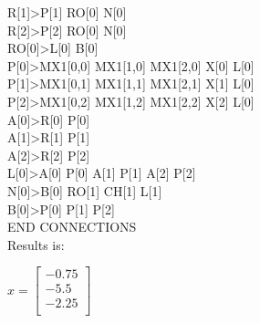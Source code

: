 \documentclass[12pt,a4paper]{article}
\begin{document}
R[1]>P[1] RO[0] N[0]\\
R[2]>P[2] RO[0] N[0]\\
RO[0]>L[0] B[0]\\
P[0]>MX1[0,0] MX1[1,0] MX1[2,0] X[0] L[0]\\
P[1]>MX1[0,1] MX1[1,1] MX1[2,1] X[1] L[0]\\
P[2]>MX1[0,2] MX1[1,2] MX1[2,2] X[2] L[0]\\
A[0]>R[0] P[0]\\
A[1]>R[1] P[1]\\
A[2]>R[2] P[2]\\
L[0]>A[0] P[0] A[1] P[1] A[2] P[2]\\
N[0]>B[0] RO[1] CH[1] L[1]\\
B[0]>P[0] P[1] P[2]\\
END CONNECTIONS\\

Results is:

$x=\begin{bmatrix}
-0.75\\
-5.5\\
-2.25\\
\end{bmatrix}$
     
\end{document}
